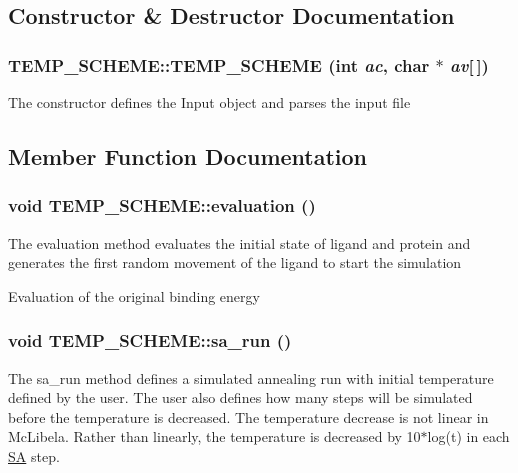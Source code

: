 \subsection{Constructor \& Destructor Documentation}
\hypertarget{classTEMP__SCHEME_abfda658a31fbb1178afd3c10f3ed21a2}{
\subsubsection[{TEMP\_\-SCHEME}]{\setlength{\rightskip}{0pt plus 5cm}TEMP\_\-SCHEME::TEMP\_\-SCHEME (int {\em ac}, \/  char $\ast$ {\em av}\mbox{[}$\,$\mbox{]})}}
\label{classTEMP__SCHEME_abfda658a31fbb1178afd3c10f3ed21a2}
The constructor defines the Input object and parses the input file 

\subsection{Member Function Documentation}
\hypertarget{classTEMP__SCHEME_a256532c5ca880e747c22080619833a11}{
\subsubsection[{evaluation}]{\setlength{\rightskip}{0pt plus 5cm}void TEMP\_\-SCHEME::evaluation ()}}
\label{classTEMP__SCHEME_a256532c5ca880e747c22080619833a11}
The evaluation method evaluates the initial state of ligand and protein and generates the first random movement of the ligand to start the simulation 

Evaluation of the original binding energy \hypertarget{classTEMP__SCHEME_aba6ebed5456be151206d71a7e2e35745}{
\subsubsection[{sa\_\-run}]{\setlength{\rightskip}{0pt plus 5cm}void TEMP\_\-SCHEME::sa\_\-run ()}}
\label{classTEMP__SCHEME_aba6ebed5456be151206d71a7e2e35745}
The sa\_\-run method defines a simulated annealing run with initial temperature defined by the user. The user also defines how many steps will be simulated before the temperature is decreased. The temperature decrease is not linear in McLibela. Rather than linearly, the temperature is decreased by 10$\ast$log(t) in each \hyperlink{classSA}{SA} step. 

